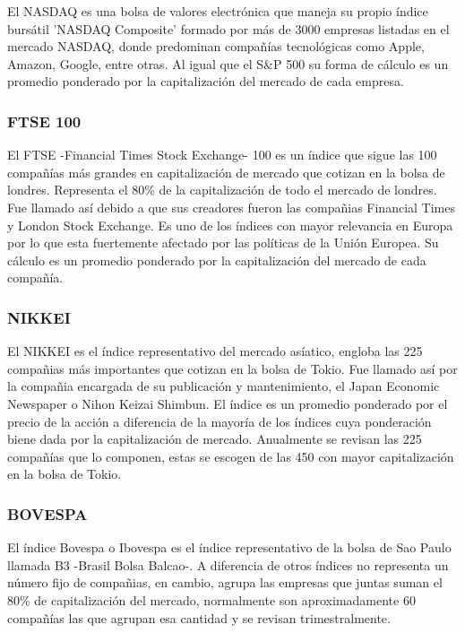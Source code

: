\documentclass[a4paper,12pt]{Latex/Classes/PhDthesisPSnPDF}
\begin{document}
El NASDAQ es una bolsa de valores electrónica que maneja su propio índice bursátil 'NASDAQ Composite' formado por más de 3000 empresas listadas en el mercado NASDAQ, donde predominan compañías tecnológicas como Apple, Amazon, Google, entre otras. Al igual que el S\&P 500 su forma de cálculo es un promedio ponderado por la capitalización del mercado de cada empresa. 

\subsubsection{FTSE 100}

El FTSE -Financial Times Stock Exchange- 100 es un índice que sigue las 100 compañías más grandes en capitalización de mercado que cotizan en la bolsa de londres. Representa el 80\% de la capitalización de todo el mercado de londres. Fue llamado así debido a que sus creadores fueron las compañias Financial Times y London Stock Exchange. Es uno de los índices con mayor relevancia en Europa por lo que esta fuertemente afectado por las políticas de la Unión Europea. Su cálculo es un promedio ponderado por la capitalización del mercado de cada compañía.

\subsubsection{NIKKEI}

El NIKKEI es el índice representativo del mercado asíatico, engloba las 225 compañias más importantes que cotizan en la bolsa de Tokio. Fue llamado así por la compañia encargada de su publicación y mantenimiento, el Japan Economic Newspaper o Nihon Keizai Shimbun. El índice es un promedio ponderado por el precio de la acción a diferencia de la mayoría de los índices cuya ponderación biene dada por la capitalización de mercado. Anualmente se revisan las 225 compañías que lo componen, estas se escogen de las 450 con mayor capitalización en la bolsa de Tokio.

\subsubsection{BOVESPA}

El índice Bovespa o Ibovespa es el índice representativo de la bolsa de Sao Paulo llamada B3 -Brasil Bolsa Balcao-. A diferencia de otros índices no representa un número fijo de compañias, en cambio, agrupa las empresas que juntas suman el 80\% de capitalización del mercado, normalmente son aproximadamente 60 compañías las que agrupan esa cantidad y se revisan trimestralmente.
\end{document}
